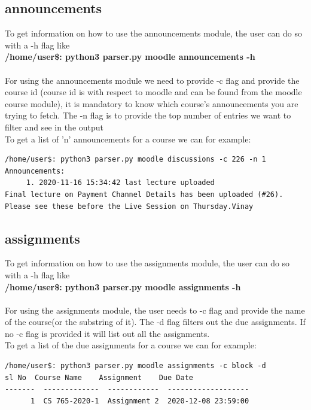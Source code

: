 \documentclass[12pt, letterpaper, twoside]{article}
\begin{document}
\subsection{announcements}
To get information on how to use the announcements module, the user can do so with a -h flag like \\
\textbf{/home/user\$: python3 parser.py moodle announcements -h}\\
\\
For using the announcements module we need to provide -c flag and provide the course id (course id is with respect to moodle and can be found from the moodle course module), it is mandatory to know which course's announcements you are trying to fetch. The -n flag is to provide the top number of entries we want to filter and see in the output\\
To get a list of 'n' announcements for a course we can for example:
\begin{verbatim}
/home/user$: python3 parser.py moodle discussions -c 226 -n 1
Announcements:
	 1. 2020-11-16 15:34:42 last lecture uploaded
Final lecture on Payment Channel Details has been uploaded (#26). 
Please see these before the Live Session on Thursday.Vinay
\end{verbatim}

\subsection{assignments}
To get information on how to use the assignments module, the user can do so with a -h flag like \\
\textbf{/home/user\$: python3 parser.py moodle assignments -h}\\
\\
For using the assignments module, the user needs to -c flag and provide the name of the course(or the substring of it). The -d flag filters out the due assignments. If no -c flag is provided it will list out all the assignments.\\
To get a list of the due assignments for a course we can for example:
\begin{verbatim}
/home/user$: python3 parser.py moodle assignments -c block -d
sl No  Course Name    Assignment    Due Date
-------  -------------  ------------  -------------------
      1  CS 765-2020-1  Assignment 2  2020-12-08 23:59:00
\end{verbatim}
\end{document}
